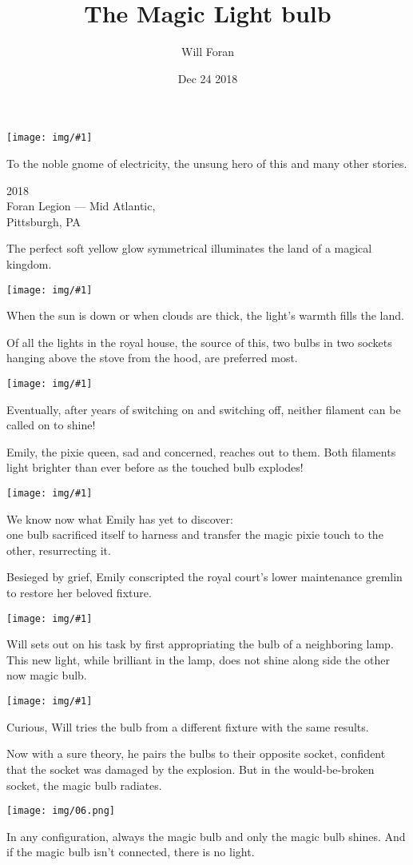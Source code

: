 \documentclass[extrafontsizes,20pt]{memoir}
\title{The Magic Light bulb}
\author{Will Foran}
\date{Dec 24 2018}
\newcommand\img[1]{\begin{center}\vspace*{\fill}\texttt{[image: img/\#1]}\vspace*{\fill}\end{center}}
\newcommand\emptypage{\null\newpage}
\begin{document}
\newpage
\img{00}

\newpage
\small
To the noble gnome of electricity, the unsung hero of this and many other stories.
\vfill
\begin{footnotesize}
\noindent\textcopyright{} 2018  \\
Foran Legion --- Mid Atlantic, \\
Pittsburgh, PA \\
\end{footnotesize} 

\emptypage{}
\emptypage{}
\emptypage{}
\emptypage{}
\emptypage{}

\newpage
The perfect soft yellow glow symmetrical illuminates the land of a magical kingdom.
\img{01}
When the sun is down or when clouds are thick, the light's warmth fills the land.

\newpage
Of all the lights in the royal house, the source of this, 
two bulbs in two sockets hanging above the stove from the hood, are preferred most.
\img{02}
Eventually, after years of switching on and switching off, neither filament can be called on to shine!

\newpage
Emily, the pixie queen, sad and concerned, reaches out to them. 
Both filaments light brighter than ever before as the touched bulb explodes!
\img{03}
   {\small
      We know now what Emily has yet to discover:\\
      \indent one bulb sacrificed itself to harness and transfer the magic pixie touch to the other, resurrecting it.
   }

\newpage
Besieged by grief, Emily conscripted the royal court's lower maintenance gremlin to restore her beloved fixture. 
\img{04}

\newpage
Will sets out on his task by first appropriating the bulb of a neighboring lamp. This new light, while brilliant in the lamp, does not shine along side the other now magic bulb.
\img{05}
Curious, Will tries the bulb from a different fixture with the same results.

\newpage
Now with a sure theory, he pairs the bulbs to their opposite socket, confident that the socket was damaged by the explosion. But in the would-be-broken socket, the magic bulb radiates.
\begin{center}\vspace*{\fill}\texttt{[image: img/06.png]}\vspace*{\fill}\end{center}
In any configuration, always the magic bulb and only the magic bulb shines. And if the magic bulb isn't connected, there is no light.
\end{document}

